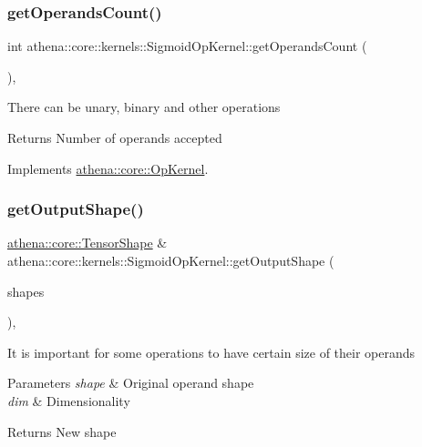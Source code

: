 \subsubsection{\texorpdfstring{get\+Operands\+Count()}{getOperandsCount()}}
{\footnotesize\ttfamily int athena\+::core\+::kernels\+::\+Sigmoid\+Op\+Kernel\+::get\+Operands\+Count (\begin{DoxyParamCaption}{ }\end{DoxyParamCaption})\hspace{0.3cm}{\ttfamily [override]}, {\ttfamily [virtual]}}

There can be unary, binary and other operations \begin{DoxyReturn}{Returns}
Number of operands accepted 
\end{DoxyReturn}


Implements \mbox{\hyperlink{classathena_1_1core_1_1_op_kernel_add97d4c132d80ecd9915acfedf7c9119}{athena\+::core\+::\+Op\+Kernel}}.

\mbox{\label{classathena_1_1core_1_1kernels_1_1_sigmoid_op_kernel_a67e52f29a93f345ebf48801d835cef62}} 
\subsubsection{\texorpdfstring{get\+Output\+Shape()}{getOutputShape()}}
{\footnotesize\ttfamily \mbox{\hyperlink{classathena_1_1core_1_1_tensor_shape}{athena\+::core\+::\+Tensor\+Shape}} \& athena\+::core\+::kernels\+::\+Sigmoid\+Op\+Kernel\+::get\+Output\+Shape (\begin{DoxyParamCaption}\item[{const std\+::vector$<$ \mbox{\hyperlink{classathena_1_1core_1_1_tensor_shape}{athena\+::core\+::\+Tensor\+Shape}} \& $>$ \&}]{shapes }\end{DoxyParamCaption})\hspace{0.3cm}{\ttfamily [override]}, {\ttfamily [virtual]}}

It is important for some operations to have certain size of their operands 
\begin{DoxyParams}{Parameters}
{\em shape} & Original operand shape \\
\hline
{\em dim} & Dimensionality \\
\hline
\end{DoxyParams}
\begin{DoxyReturn}{Returns}
New shape 
\end{DoxyReturn}



